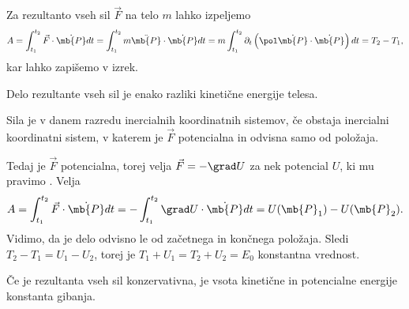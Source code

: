 Za rezultanto vseh sil $\vec{F}$ na telo $m$ lahko izpeljemo
\[
  A = \int_{t_1}^{t_2} \vec{F} \cdot \dot{\mb{P}} dt
  = \int_{t_1}^{t_2} m \ddot{\mb{P}} \cdot \dot{\mb{P}} dt
  = m \int_{t_1}^{t_2} \partial_t \left(\pol \dot{\mb{P}} \cdot \dot{\mb{P}}\right) dt
  = T_2 - T_1,
\]
kar lahko zapišemo v izrek.

\begin{izrek}
  Delo rezultante vseh sil je enako razliki kinetične energije telesa.
\end{izrek}


\begin{definicija}
  Sila je  v danem razredu inercialnih koordinatnih
  sistemov, če obstaja inercialni koordinatni sistem, v katerem je $\vec{F}$
  potencialna in odvisna samo od položaja.
\end{definicija}

Tedaj je $\vec{F}$ potencialna, torej velja $\vec{F} = - \grad U$ za nek
potencial $U$, ki mu pravimo .
Velja
\[
  A = \int_{t_1}^{t_2} \vec{F} \cdot \dot{\mb{P}} dt
  = - \int_{t_1}^{t_2} \grad U \cdot \dot{\mb{P}} dt
  = U(\mb{P}_1) - U(\mb{P}_2).
\]
Vidimo, da je delo odvisno le od začetnega in končnega položaja.
Sledi $T_2 - T_1 = U_1 - U_2$, torej je $T_1 + U_1 = T_2 + U_2 = E_0$ konstantna
vrednost.

\begin{izrek}
  Če je rezultanta vseh sil konzervativna, je vsota kinetične in potencialne
  energije konstanta gibanja.
\end{izrek}

